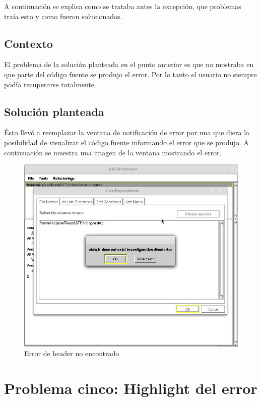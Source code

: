 \documentclass[a4paper,oneside,12pt]{article}
\begin{document}
A continuaci\'on se explica como se trataba antes la excepci\'on, que problemas tra\'ia esto y como fueron solucionados.

\subsection{Contexto}
El problema de la soluci\'on planteada en el punto anterior es que no mostraba en que parte del c\'odigo fuente se produjo el error. Por lo tanto el usuario no siempre pod\'ia recuperarse totalmente.

\subsection{Soluci\'on planteada}
\'Esto llev\'o a reemplazar la ventana de notificaci\'on de error por una que diera la posibilidad de visualizar el c\'odigo fuente informando el error que se produjo. A continuación se muestra una imagen de la ventana mostrando el error.

\begin{figure}[h!]
  \centering
    \includegraphics[scale=0.50]{images/codigo_modificado/error_header_no_encontrado.jpg}
     \caption{Error de header no encontrado}
\end{figure}

\section{Problema cinco: Highlight del error}
\end{document}
